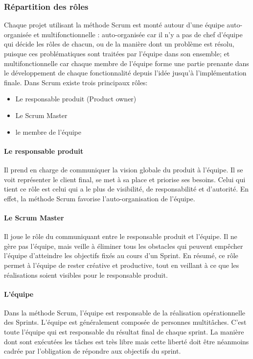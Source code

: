 \subsubsection{Répartition des rôles}
Chaque projet utilisant la méthode Scrum est monté autour d’une équipe auto-
organisée et multifonctionnelle : auto-organisée car il n’y a pas de chef d’équipe qui
décide les rôles de chacun, ou de la manière dont un problème est résolu, puisque ces
problématiques sont traitées par l’équipe dans son ensemble; et multifonctionnelle car
chaque membre de l’équipe forme une partie prenante dans le développement de
chaque fonctionnalité depuis l’idée jusqu’à l’implémentation finale.
Dans Scrum existe trois principaux rôles:
\begin{itemize}
 \item Le responsable produit (Product owner)
 \item Le Scrum Master
 \item le membre de l’équipe
\end{itemize}
\paragraph{Le responsable produit}
Il prend en charge de communiquer la
vision globale du produit à l’équipe. 
Il se voit représenter le client final, se met à sa place
et priorise ses besoins. Celui qui tient ce rôle est celui qui 
a le plus de visibilité, de responsabilité et d’autorité.
En effet, la méthode Scrum favorise l’auto-organisation de l'équipe.
\paragraph{Le Scrum Master}
Il joue le rôle du communiquant entre le responsable produit et
l’équipe. Il ne gère pas l’équipe, mais veille à éliminer tous les obstacles qui peuvent
empêcher l’équipe d’atteindre les objectifs fixés au cours d’un Sprint. En résumé, ce rôle
permet à l’équipe de rester créative et productive, tout en veillant à ce que les
réalisations soient visibles pour le responsable produit.
\paragraph{L'équipe}
Dans la méthode Scrum, l’équipe est responsable de la réalisation
opérationnelle des Sprints. L’équipe est généralement composée de personnes
multitâches. C’est toute l’équipe qui est responsable du résultat final de chaque sprint.
La manière dont sont exécutées les tâches est très libre mais cette liberté doit être
néanmoins cadrée par l’obligation de répondre aux objectifs du sprint.
